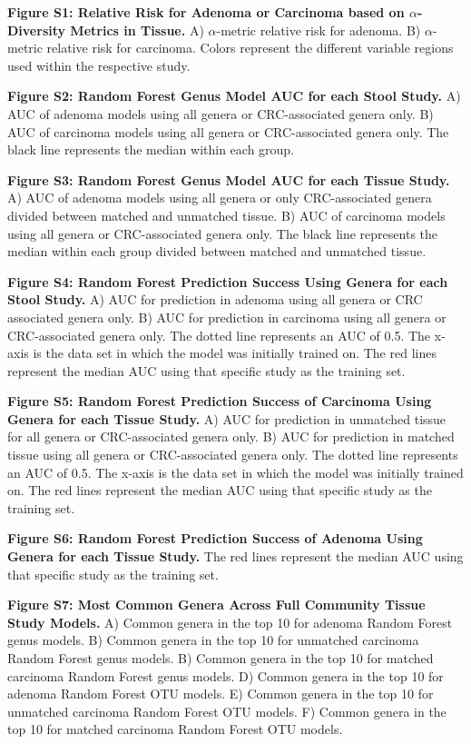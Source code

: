 \documentclass[12pt,]{article}
\begin{document}
\newpage

\textbf{Figure S1: Relative Risk for Adenoma or Carcinoma based on
\(\alpha\)-Diversity Metrics in Tissue.} A) \(\alpha\)-metric relative
risk for adenoma. B) \(\alpha\)-metric relative risk for carcinoma.
Colors represent the different variable regions used within the
respective study.

\textbf{Figure S2: Random Forest Genus Model AUC for each Stool Study.}
A) AUC of adenoma models using all genera or CRC-associated genera only.
B) AUC of carcinoma models using all genera or CRC-associated genera
only. The black line represents the median within each group.

\textbf{Figure S3: Random Forest Genus Model AUC for each Tissue Study.}
A) AUC of adenoma models using all genera or only CRC-associated genera
divided between matched and unmatched tissue. B) AUC of carcinoma models
using all genera or CRC-associated genera only. The black line
represents the median within each group divided between matched and
unmatched tissue.

\textbf{Figure S4: Random Forest Prediction Success Using Genera for
each Stool Study.} A) AUC for prediction in adenoma using all genera or
CRC associated genera only. B) AUC for prediction in carcinoma using all
genera or CRC-associated genera only. The dotted line represents an AUC
of 0.5. The x-axis is the data set in which the model was initially
trained on. The red lines represent the median AUC using that specific
study as the training set.

\textbf{Figure S5: Random Forest Prediction Success of Carcinoma Using
Genera for each Tissue Study.} A) AUC for prediction in unmatched tissue
for all genera or CRC-associated genera only. B) AUC for prediction in
matched tissue using all genera or CRC-associated genera only. The
dotted line represents an AUC of 0.5. The x-axis is the data set in
which the model was initially trained on. The red lines represent the
median AUC using that specific study as the training set.

\textbf{Figure S6: Random Forest Prediction Success of Adenoma Using
Genera for each Tissue Study.} The red lines represent the median AUC
using that specific study as the training set.

\textbf{Figure S7: Most Common Genera Across Full Community Tissue Study
Models.} A) Common genera in the top 10 for adenoma Random Forest genus
models. B) Common genera in the top 10 for unmatched carcinoma Random
Forest genus models. B) Common genera in the top 10 for matched
carcinoma Random Forest genus models. D) Common genera in the top 10 for
adenoma Random Forest OTU models. E) Common genera in the top 10 for
unmatched carcinoma Random Forest OTU models. F) Common genera in the
top 10 for matched carcinoma Random Forest OTU models.

\newpage
\end{document}
